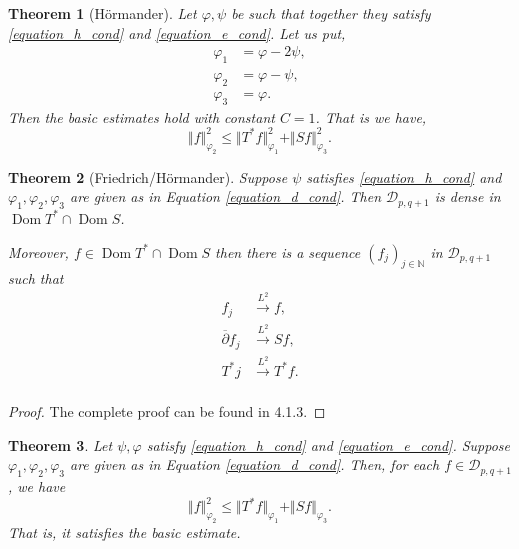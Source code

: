 \documentclass{article}
\newtheorem{theorem}{Theorem} [section]
\DeclareMathOperator{\Dom}{Dom}
\newcommand{\norm}[1]{\Vert #1 \Vert}
\newcommand{\N}[0]{\mathbb{N}}
\begin{document}
\begin{theorem}[Hörmander]
  Let $\varphi,\psi$ be such that together they satisfy \eqref{equation_h_cond} and \eqref{equation_e_cond}. Let us put,
  \begin{align*}
  \varphi_1 & = \varphi-2\psi,\\
  \varphi_2 & = \varphi-\psi,\\
  \varphi_3 & = \varphi.
  \label{equation_d_cond}\tag{D}
\end{align*}
Then the basic estimates hold with constant $C=1$. That is we have,
\begin{equation*}
\norm{f}^2_{\varphi_2}\leq \norm{T^*f}^2_{\varphi_1}+\norm{Sf}^2_{\varphi_3}.
\end{equation*}
\end{theorem}
\begin{theorem}[Friedrich/Hörmander]
  Suppose $\psi$ satisfies \eqref{equation_h_cond} and $\varphi_1,\varphi_2,\varphi_3$ are given as in Equation \eqref{equation_d_cond}. Then $\mathcal{D}_{p,q+1}$ is dense in $\Dom T^*\cap \Dom S$.
  \par Moreover, $f\in\Dom T^*\cap \Dom S$ then there is a sequence $(f_j)_{j\in\N}$ in $\mathcal{D}_{p,q+1}$ such that 
  \begin{align*}
    f_j&\stackrel{L^2}{\to}f,\\
    \overline{\partial}f_j&\stackrel{L^2}{\to}Sf,\\
    T^*j&\stackrel{L^2}{\to}T^*f.\\
  \end{align*}
\end{theorem}
\begin{proof}
  The complete proof can be found in \cite{Hom} 4.1.3.
\end{proof}
\begin{theorem}
  Let $\psi,\varphi$ satisfy \eqref{equation_h_cond} and \eqref{equation_e_cond}. Suppose $\varphi_1,\varphi_2,\varphi_3$ are given as in Equation \eqref{equation_d_cond}. Then, for each $f\in\mathcal{D}_{p,q+1}$, we have 
  \begin{equation*}
  \norm{f}^2_{\varphi_2}\leq \norm{T^*f}_{\varphi_1}+\norm{Sf}_{\varphi_3}.
  \end{equation*}
  That is, it satisfies the basic estimate.
\end{theorem}
\end{document}
